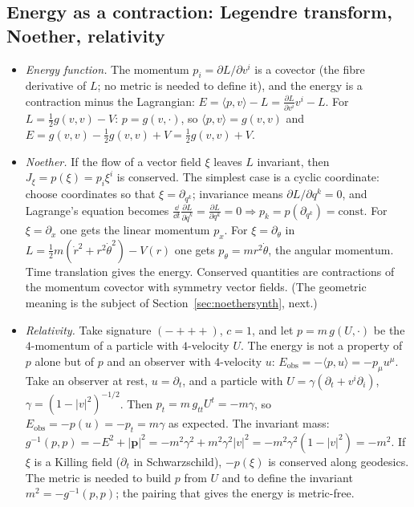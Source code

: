 \subsection{Energy as a contraction: Legendre transform, Noether, relativity}\label{sec:phys-energy}

\begin{itemize}
\item \emph{Energy function.} The momentum $p_i=\partial L/\partial v^i$ is a covector (the fibre derivative of $L$; no metric is needed to define it), and the energy is a contraction minus the Lagrangian:
$E=\langle p,v\rangle-L=\frac{\partial L}{\partial v^i}v^i-L$. For $L=\frac12g(v,v)-V$: $p=g(v,\cdot)$, so $\langle p,v\rangle=g(v,v)$ and $E=g(v,v)-\frac12g(v,v)+V=\frac12g(v,v)+V$.
\item \emph{Noether.} If the flow of a vector field $\xi$ leaves $L$ invariant, then $J_\xi=p(\xi)=p_i\xi^i$ is conserved. The simplest case is a cyclic coordinate: choose coordinates so that $\xi=\partial_{q^k}$; invariance means $\partial L/\partial q^k=0$, and Lagrange's equation becomes
$\frac{\dd}{\dd t}\frac{\partial L}{\partial\dot q^k}=\frac{\partial L}{\partial q^k}=0\Rightarrow p_k=p(\partial_{q^k})=\mathrm{const}$.
For $\xi=\partial_x$ one gets the linear momentum $p_x$. For $\xi=\partial_\theta$ in $L=\frac12m(\dot r^2+r^2\dot\theta^2)-V(r)$ one gets $p_\theta=mr^2\dot\theta$, the angular momentum. Time translation gives the energy. Conserved quantities are contractions of the momentum covector with symmetry vector fields. (The geometric meaning is the subject of Section~\ref{sec:noethersynth}, next.)
\item \emph{Relativity.} Take signature $(-+++)$, $c=1$, and let $p=m\,g(U,\cdot)$ be the $4$-momentum of a particle with $4$-velocity $U$. The energy is not a property of $p$ alone but of $p$ and an observer with $4$-velocity $u$:
$E_{\mathrm{obs}}=-\langle p,u\rangle=-p_\mu u^\mu$.
\numcheck Take an observer at rest, $u=\partial_t$, and a particle with $U=\gamma(\partial_t+v^i\partial_i)$, $\gamma=(1-|v|^2)^{-1/2}$. Then $p_t=m\,g_{tt}U^t=-m\gamma$, so $E_{\mathrm{obs}}=-p(u)=-p_t=m\gamma$ as expected. The invariant mass: $g^{-1}(p,p)=-E^2+|\mathbf p|^2=-m^2\gamma^2+m^2\gamma^2|v|^2=-m^2\gamma^2(1-|v|^2)=-m^2$.
If $\xi$ is a Killing field (\eg $\partial_t$ in Schwarzschild), $-p(\xi)$ is conserved along geodesics. The metric is needed to build $p$ from $U$ and to define the invariant $m^2=-g^{-1}(p,p)$; the pairing that gives the energy is metric-free.
\end{itemize}
